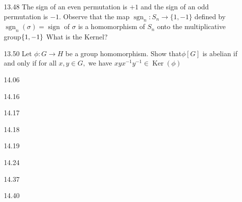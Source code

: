 \documentclass[12pt]{article}
\begin{document}
\begin{enumerate}
	\item[13.48]The sign of an even permutation is $ + 1 $ and the sign of an odd permutation is $ - 1 . $ Observe that the map $ \operatorname { sgn } _ { n } : S _ { n } \rightarrow \{ 1 , - 1 \} $ defined by $ \operatorname { sgn } _ { n } ( \sigma ) = \operatorname { sign } $ of $ \sigma $ is a homomorphism of $ S _ { n } $ onto the multiplicative group$ \{ 1 , - 1 \}\\ $ What is the Kernel?
	
	\item[13.50]Let $ \phi : G \rightarrow H $ be a group homomorphism. Show that$ \phi [ G ] $ is abelian if and only if for all $ x , y \in G , $ we have $ x y x ^ { - 1 } y ^ { - 1 } \in \operatorname { Ker } ( \phi ) $
	
	\item[14.06]
	
	\item[14.16]
	
	\item[14.17]
	
	\item[14.18]
	
	\item[14.19]
	
	\item[14.24]
	
	\item[14.37]
	
	\item[14.40]

\end{enumerate}
\end{document}
